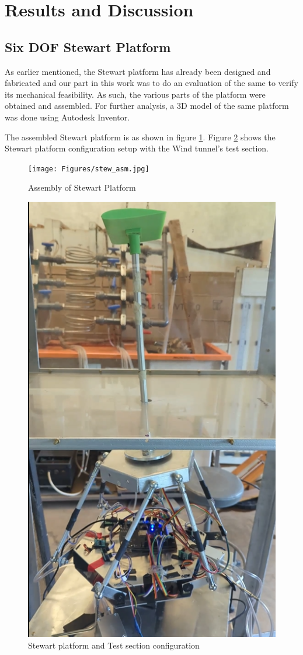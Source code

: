 \section{Results and Discussion}
\subsection{Six DOF Stewart Platform}
As earlier mentioned, the Stewart platform has already been designed and fabricated and our part in this work was to do an evaluation of the same to verify its mechanical feasibility. As such, the various parts of the platform were obtained and assembled. For further analysis, a 3D model of the same platform was done using Autodesk Inventor.

The assembled Stewart platform is as shown in figure \ref{fig}. Figure \ref{fig1} shows the Stewart platform configuration setup with the Wind tunnel's test section.
\begin{center}
	\begin{figure}[H]
		\centering
		\texttt{[image: Figures/stew\_asm.jpg]}
		\caption[Assembled Platform]{Assembly of Stewart Platform}
		\label{fig}
	\end{figure}
\end{center}
\begin{center}
	\begin{figure}[H]
		\centering
		\includegraphics[width=0.7\linewidth]{Figures/stew_wind1.png}
		\caption[Model placement in Test Section]{Stewart platform and Test section configuration}
		\label{fig1}
	\end{figure}
\end{center}

